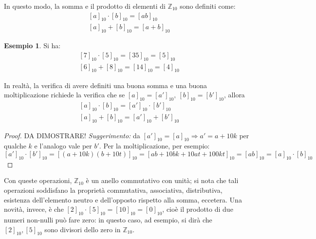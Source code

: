 \documentclass[11pt, a4paper]{scrartcl}
\theoremstyle{definition}
\newtheorem{esempio}{Esempio}
\numberwithin{esempio}{section}
\theoremstyle{definition}
\numberwithin{obs}{section}
\numberwithin{nota}{section}
\numberwithin{equation}{subsection}
\begin{document}
In questo modo, la somma e il prodotto di elementi di $\mathbb{Z}_{10} $ sono definiti come:
\begin{equation}
	\begin{split}
		&[a]_{10} \cdot [b] _{10}  = [ab]_{10} \\
		& [a]_{10}  + [b] _{10}  = [ a+ b ] _{10} 
	\end{split}
\end{equation}
\begin{esempio}
Si ha:
\[
	\begin{split}
		&[7]_{10} \cdot [5]_{10} = [35]_{10} = [5]_{10} \\
		&[6]_{10} + [8]_{10} = [14]_{10} = [4]_{10} 
	\end{split}
\] 
\end{esempio}
In realt\`a, la verifica di avere definiti una buona somma e una buona moltiplicazione richiede la verifica che se $[a]_{10} = [a']_{10}, \ [b]_{10} = [b']_{10} $, allora
\[
	\begin{split}
		&[a]_{10} \cdot [b]_{10} = [a']_{10} \cdot [b']_{10} \\
		&[a]_{10} + [b]_{10} = [a']_{10} + [b']_{10} 
	\end{split}
\] 
\begin{proof}
{\color{red} DA DIMOSTRARE!} 
\textit{Suggerimento:} da $[a']_{10} = [a]_{10} \Rightarrow a' = a+10k$ per qualche $k$ e l'analogo vale per $b'$. 
Per la moltiplicazione, per esempio:
\[
	[a']_{10} \cdot [b']_{10} = [(a+10k)(b+10t)]_{10} = [ab + 10bk + 10at + 100 kt]_{10} = [ab]_{10} = [a]_{10} \cdot [b]_{10} 
\] 
\end{proof}
Con queste operazioni, $\mathbb{Z}_{10} $ \`e un anello commutativo con unit\`a; si nota che tali operazioni soddisfano la propriet\`a commutativa, associativa, distributiva, esistenza dell'elemento neutro e dell'opposto rispetto alla somma, eccetera.
Una novit\`a, invece, \`e che $[2]_{10} \cdot [5]_{10} = [10]_{10} = [0]_{10} $, cio\`e il prodotto di due numeri non-nulli pu\`o fare zero: in questo caso, ad esempio, si dir\`a che $[2]_{10} , [5]_{10} $ sono divisori dello zero in $\mathbb{Z}_{10} $.
\end{document}
